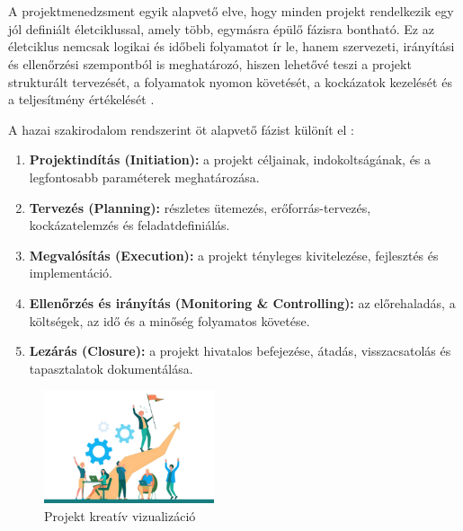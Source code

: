 \chapter{\projectlifecycle}

A projektmenedzsment egyik alapvető elve, hogy minden projekt rendelkezik egy jól definiált életciklussal, 
amely több, egymásra épülő fázisra bontható. 
Ez az életciklus nemcsak logikai és időbeli folyamatot ír le, hanem szervezeti, irányítási és ellenőrzési szempontból is meghatározó, 
hiszen lehetővé teszi a projekt strukturált tervezését, a folyamatok nyomon követését, a kockázatok kezelését és a teljesítmény értékelését \cite{Szalay2018,Hajdu2014,Kaposi2019}. 

A hazai szakirodalom rendszerint öt alapvető fázist különít el \cite{Kovacs2016,Simon2015}:

\begin{enumerate}
    \item \textbf{Projektindítás (Initiation):} a projekt céljainak, indokoltságának, és a legfontosabb paraméterek meghatározása.
    \item \textbf{Tervezés (Planning):} részletes ütemezés, erőforrás-tervezés, kockázatelemzés és feladatdefiniálás.
    \item \textbf{Megvalósítás (Execution):} a projekt tényleges kivitelezése, fejlesztés és implementáció.
    \item \textbf{Ellenőrzés és irányítás (Monitoring \& Controlling):} az előrehaladás, a költségek, az idő és a minőség folyamatos követése.
    \item \textbf{Lezárás (Closure):} a projekt hivatalos befejezése, átadás, visszacsatolás és tapasztalatok dokumentálása.
\end{enumerate}

\begin{figure}[H]
    \centering
    \includegraphics[width=50mm, keepaspectratio]{figures/project_creative.png}
    \caption{Projekt kreatív vizualizáció}
    \label{fig:project_creative}
\end{figure}

